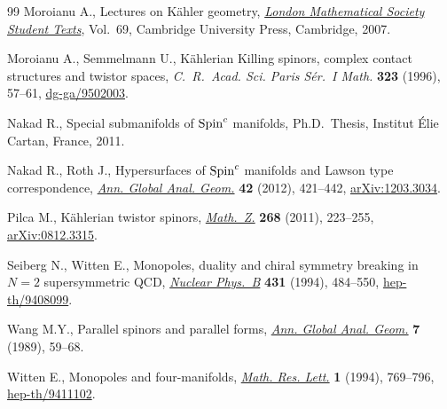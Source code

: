 \documentclass[pdftex]{sigma}
\numberwithin{equation}{section}
\theoremstyle{definition}
\begin{document}
\begin{thebibliography}{99}
Moroianu A., Lectures on {K}\"ahler geometry, \href{http://dx.doi.org/10.1017/CBO9780511618666}{\textit{London Mathematical
  Society Student Texts}}, Vol.~69, Cambridge University Press, Cambridge, 2007.

Moroianu A., Semmelmann U., K\"ahlerian {K}illing spinors, complex contact
  structures and twistor spaces, \textit{C.~R.~Acad. Sci. Paris S\'er.~I Math.}
  \textbf{323} (1996), 57--61, \href{http://arxiv.org/abs/dg-ga/9502003}{dg-ga/9502003}.

Nakad R., Special submanifolds of {${\rm Spin}^c$} manifolds, Ph.D.~Thesis,
  Institut \'Elie Cartan, France, 2011.

Nakad R., Roth J., Hypersurfaces of {${\rm Spin}^c$} manifolds and {L}awson
  type correspondence, \href{http://dx.doi.org/10.1007/s10455-012-9321-5}{\textit{Ann. Global Anal. Geom.}} \textbf{42} (2012),
  421--442, \href{http://arxiv.org/abs/1203.3034}{arXiv:1203.3034}.

Pilca M., K\"ahlerian twistor spinors, \href{http://dx.doi.org/10.1007/s00209-010-0668-7}{\textit{Math.~Z.}} \textbf{268} (2011),
  223--255, \href{http://arxiv.org/abs/0812.3315}{arXiv:0812.3315}.

Seiberg N., Witten E., Monopoles, duality and chiral symmetry breaking in
  {$N=2$} supersymmetric {QCD}, \href{http://dx.doi.org/10.1016/0550-3213(94)90214-3}{\textit{Nuclear Phys.~B}} \textbf{431} (1994),
  484--550, \href{http://arxiv.org/abs/hep-th/9408099}{hep-th/9408099}.

Wang M.Y., Parallel spinors and parallel forms, \href{http://dx.doi.org/10.1007/BF00137402}{\textit{Ann. Global Anal.
  Geom.}} \textbf{7} (1989), 59--68.

Witten E., Monopoles and four-manifolds, \href{http://dx.doi.org/10.4310/MRL.1994.v1.n6.a13}{\textit{Math. Res. Lett.}} \textbf{1}
  (1994), 769--796, \href{http://arxiv.org/abs/hep-th/9411102}{hep-th/9411102}.

\end{thebibliography}\LastPageEnding
\end{document}
